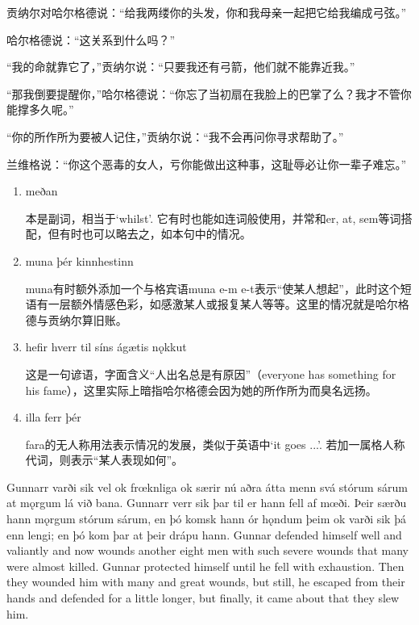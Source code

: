 \begin{translation*}{}
  贡纳尔对哈尔格德说：“给我两缕你的头发，你和我母亲一起把它给我编成弓弦。”

  哈尔格德说：“这关系到什么吗？”

  “我的命就靠它了，”贡纳尔说：“只要我还有弓箭，他们就不能靠近我。”

  “那我倒要提醒你，”哈尔格德说：“你忘了当初扇在我脸上的巴掌了么？我才不管你能撑多久呢。”

  “你的所作所为要被人记住，”贡纳尔说：“我不会再问你寻求帮助了。”

  兰维格说：“你这个恶毒的女人，亏你能做出这种事，这耻辱必让你一辈子难忘。”
\end{translation*}
\begin{grammar*}{}
  \begin{enumerate}[leftmargin=*]
    \item meðan

          本是副词，相当于`whilst'. 它有时也能如连词般使用，并常和er, at, sem等词搭配，但有时也可以略去之，如本句中的情况。

    \item muna þér kinnhestinn

          muna有时额外添加一个与格宾语muna e-m e-t表示“使某人想起”，此时这个短语有一层额外情感色彩，如感激某人或报复某人等等。这里的情况就是哈尔格德与贡纳尔算旧账。

    \item hefir hverr til síns ágætis nǫkkut

          这是一句谚语，字面含义“人出名总是有原因”（everyone has something for his fame），这里实际上暗指哈尔格德会因为她的所作所为而臭名远扬。

    \item illa ferr þér

          fara的无人称用法表示情况的发展，类似于英语中`it goes ...'. 若加一属格人称代词，则表示“某人表现如何”。
  \end{enumerate}
\end{grammar*}
\begin{paracol}{2}
  Gunnarr varði sik vel ok frœknliga ok særir nú aðra átta menn svá stórum sárum at mǫrgum lá við bana. Gunnarr verr sik þar til er hann fell af mœði. Þeir særðu hann mǫrgum stórum sárum, en þó komsk hann ór hǫndum þeim ok varði sik þá enn lengi; en þó kom þar at þeir drápu hann.
  \switchcolumn
  Gunnar defended himself well and valiantly and now wounds another eight men with such severe wounds that many were almost killed. Gunnar protected himself until he fell with exhaustion. Then they wounded him with many and great wounds, but still, he escaped from their hands and defended for a little longer, but finally, it came about that they slew him.
\end{paracol}
